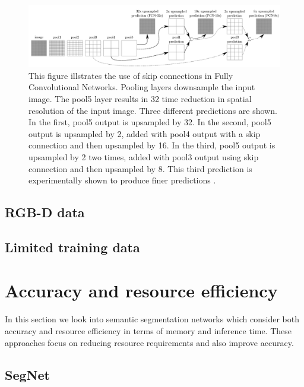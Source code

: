 	\begin{figure}
		\centering
		\includegraphics[width=1\linewidth]{images/fcn_skip}
		\caption{This figure illstrates the use of skip connections in Fully Convolutional Networks. Pooling layers downsample the input image. The pool5 layer results in 32 time reduction in spatial resolution of the input image. Three different predictions are shown. In the first, pool5 output is upsampled by 32. In the second, pool5 output is upsampled by 2, added with pool4 output with a skip connection and then upsampled by 16. In the third, pool5 output is upsampled by 2 two times, added with pool3 output using skip connection and then upsampled by 8. This third prediction is experimentally shown to produce finer predictions \cite{DBLP:journals/corr/LongSD14}.}
		\label{Fig:fcn}
	\end{figure}

\subsection{RGB-D data}

\subsection{Limited training data}

\section{Accuracy and resource efficiency}
\label{section:acceff}

In this section we look into semantic segmentation networks which consider both accuracy and resource efficiency in terms of memory and inference time. These approaches focus on reducing resource requirements and also improve accuracy.

\subsection{SegNet}

